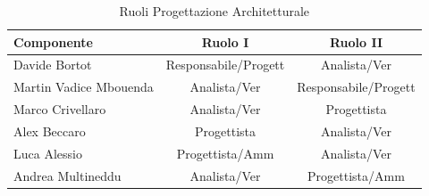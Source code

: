 \documentclass[a4paper,11pt]{article}
\begin{document}
	\begin{table}[h!]			
		\begin{center}
			\begin{tabular}{l c c}
			\textbf{Componente} & \textbf{Ruolo I} & \textbf{Ruolo II} \\
			\midrule
			Davide Bortot & Responsabile/Progett & Analista/Ver\\
			Martin Vadice Mbouenda & Analista/Ver & Responsabile/Progett\\
			Marco Crivellaro & Analista/Ver & Progettista\\
			Alex Beccaro & Progettista & Analista/Ver\\
			Luca Alessio & Progettista/Amm & Analista/Ver\\
			Andrea Multineddu & Analista/Ver & Progettista/Amm\\
			\midrule
			\end{tabular}
		\end{center}
		\caption{Ruoli Progettazione Architetturale}
		\end{table}
\end{document}
